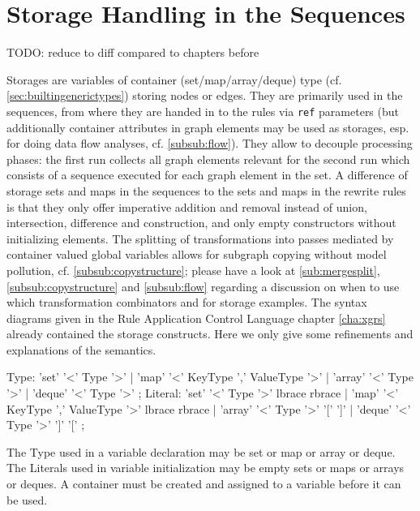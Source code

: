 \section{Storage Handling in the Sequences}\label{sec:storages}
TODO: reduce to diff compared to chapters before

Storages are variables of container (set/map/array/deque) type (cf. \ref{sec:builtingenerictypes}) storing nodes or edges.
They are primarily used in the sequences, from where they are handed in to the rules via \texttt{ref} parameters (but additionally container attributes in graph elements may be used as storages,
esp. for doing data flow analyses, cf. \ref{subsub:flow}).
They allow to decouple processing phases: the first run collects all graph elements relevant for the second run which consists of a sequence executed for each graph element in the set.
A difference of storage sets and maps in the sequences to the sets and maps in the rewrite rules is that they only offer imperative addition and removal instead of union, intersection, difference and construction, and only empty constructors without initializing elements.
The splitting of transformations into passes mediated by container valued global variables allows for subgraph copying without model pollution, cf. \ref{subsub:copystructure}; please have a look at \ref{sub:mergesplit}, \ref{subsub:copystructure} and \ref{subsub:flow} regarding a discussion on when to use which transformation combinators and for storage examples.
The syntax diagrams given in the Rule Application Control Language chapter \ref{cha:xgrs} already contained the storage constructs.
Here we only give some refinements and explanations of the semantics.

\begin{rail}
  Type: 'set' '<' Type '>'
    | 'map' '<' KeyType ',' ValueType '>'
    | 'array' '<' Type '>'
    | 'deque' '<' Type '>'
  ;
  Literal:
    'set' '<' Type '>' lbrace rbrace |
    'map' '<' KeyType ',' ValueType '>' lbrace rbrace |
    'array' '<' Type '>' '[' ']' |
    'deque' '<' Type '>' ']' '['
	;
\end{rail}%

The Type used in a variable declaration may be set or map or array or deque.
The Literals used in variable initialization may be empty sets or maps or arrays or deques.
A container must be created and assigned to a variable before it can be used.

